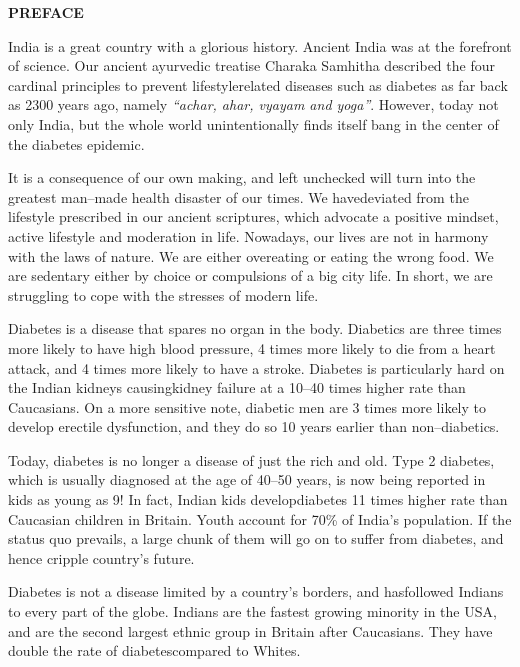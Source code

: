 \thispagestyle{empty}


\begin{center}
\Huge\textbf{PREFACE}
\end{center}

\vskip 20pt

India is a great country with a glorious history. Ancient India was at the forefront of science. Our ancient ayurvedic treatise Charaka Samhitha described the four cardinal principles to prevent lifestyle\break related diseases such as diabetes as far back as 2300 years ago, namely \textit{“achar, ahar, vyayam and yoga”}. However, today not only India, but the whole world unintentionally finds itself bang in the center of the diabetes epidemic.

It is a consequence of our own making, and left unchecked will turn into the greatest man–made health disaster of our times. We have\break deviated from the lifestyle prescribed in our ancient scriptures, which advocate a positive mindset, active lifestyle and moderation in life. Nowadays, our lives are not in harmony with the laws of nature. We are either overeating or eating the wrong food. We are sedentary either by choice or compulsions of a big city life. In short, we are struggling to cope with the stresses of modern life.

Diabetes is a disease that spares no organ in the body. Diabetics are three times more likely to have high blood pressure, 4 times more likely to die from a heart attack, and 4 times more likely to have a stroke. Diabetes is particularly hard on the Indian kidneys causing\break kidney failure at a 10–40 times higher rate than Caucasians. On a more sensitive note, diabetic men are 3 times more likely to develop erectile dysfunction, and they do so 10 years earlier than non–diabetics.

Today, diabetes is no longer a disease of just the rich and old. Type 2 diabetes, which is usually diagnosed at the age of 40–50 years, is now being reported in kids as young as 9! In fact, Indian kids develop\break diabetes 11 times higher rate than Caucasian children in Britain. Youth account for 70\% of India’s population. If the status quo prevails, a large chunk of them will go on to suffer from diabetes, and hence cripple country’s future.

Diabetes is not a disease limited by a country’s borders, and has\break followed Indians to every part of the globe. Indians are the fastest growing minority in the USA, and are the second largest ethnic group in Britain after Caucasians. They have double the rate of diabetes\break compared to Whites.

